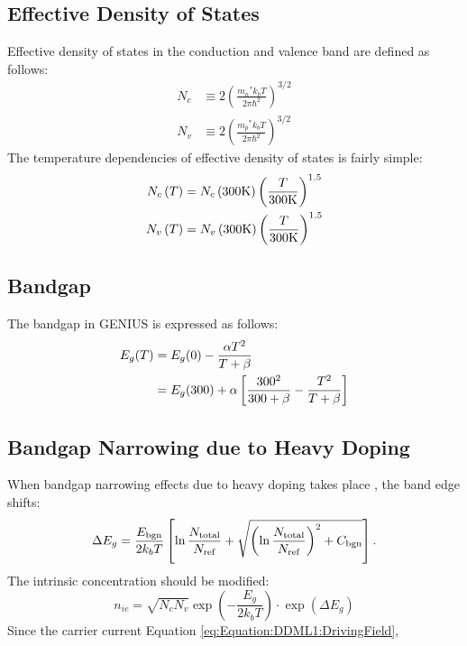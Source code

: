 \documentclass[oneside,12pt]{cgd_book}
\begin{document}
\subsection{Effective Density of States}Effective density of states\label{Density of states+effective}
in the conduction and valence band are defined as follows:
\begin{subequations}
\begin{align}
 N_{c} & \equiv 2\left( \frac{{m_{n}}^{*}k_{b}T}{2\pi\hbar^2}\right)^{3/2}\\
 N_{v}  &\equiv 2\left( \frac{{m_{p}}^{*}k_{b}T}{2\pi\hbar^2}\right)^{3/2}
\end{align}
\end{subequations}
The temperature dependencies of effective density of states is fairly simple:
\begin{subequations}
\begin{align}
 N_{c}\left(T\right) &= N_c \left( 300\text{K} \right)\left( \frac{T}{300\text{K}}\right)^{1.5}\\
 N_{v}\left(T\right) & = N_v \left( 300\text{K} \right)\left( \frac{T}{300\text{K}}\right)^{1.5}
\end{align}
\end{subequations}
\subsection{Bandgap}
The bandgap in GENIUS is expressed as follows:
\begin{subequations}
\begin{align}
 E_g (T) &= E_g (0) - \frac{\alpha T^{\rm 2} }{T + \beta} \nonumber\\
  &=E_g (300) + \alpha\left[ \frac{300^{\rm 2} }{300 + \beta} - \frac{T^2}{T + \beta} \right]
\end{align}
\end{subequations}
\subsection{Bandgap Narrowing due to Heavy Doping}When bandgap narrowing effects\label{Bandgap narrowing+Slotboom model}
due to heavy doping takes place \cite{Slotboom1977}, the band edge shifts:
\begin{equation}
\Delta E_g = \frac{E_{\rm bgn}}{2k_b T}\left[ \ln \frac{N_{\rm total}}{N_{\rm ref}} + \sqrt {\left(
        \ln \frac{N_{\rm total}}{N_{\rm ref}} \right)^2 + C_{\rm bgn}} \right].
\end{equation}
The intrinsic concentration should be modified:
\begin{equation}
n_{ie}=\sqrt{N_c N_v } \exp\left(-\frac{E_g}{2 k_b T} \right) \cdot \exp(\Delta E_g)
\end{equation}
Since the carrier current  Equation \eqref{eq:Equation:DDML1:DrivingField},
\end{document}
